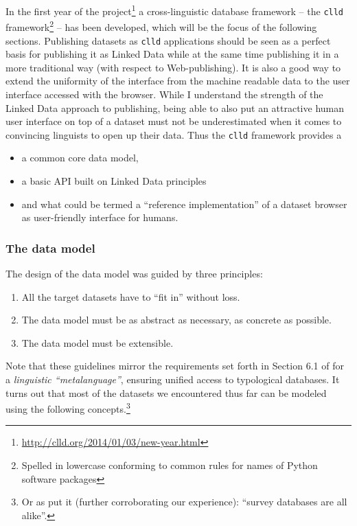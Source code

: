\documentclass[a4paper,10pt]{article}
\begin{document}
In the first year of the project\footnote{\url{http://clld.org/2014/01/03/new-year.html}} a cross-linguistic database framework -- the \texttt{clld} framework\footnote{Spelled in lowercase conforming to common rules for names of Python software packages} -- has been
developed, which will be the focus of the following sections.
Publishing datasets as \texttt{clld} applications should be seen as a perfect basis for publishing it as Linked Data while at the same time publishing it in a more traditional way (with respect to Web-publishing). It is also a good way to extend the uniformity of the interface from the machine readable data to the user interface accessed with the browser.
While I understand the strength of the Linked Data approach to publishing, being able to also put an attractive human user interface on top of a dataset must not be underestimated when it comes to convincing linguists to open up their data.
Thus the \texttt{clld} framework provides a
\begin{itemize}
\item a common core data model,
\item a basic API built on Linked Data principles
\item and what could be termed a ``reference implementation'' of a dataset browser as user-friendly
interface for humans.
\end{itemize}



\subsubsection{The data model}
\label{sec:datamodel}

The design of the data model was guided by three principles:
\begin{enumerate}
\item All the target datasets have to ``fit in'' without loss.
\item The data model must be as abstract as necessary, as concrete as possible.
\item The data model must be extensible.
\end{enumerate}

Note that these guidelines mirror the requirements set forth in Section 6.1 of 
for a \emph{linguistic ``metalanguage''}, ensuring unified access to typological databases.
It turns out that most of the datasets we encountered thus far can be modeled using the
following concepts.\footnote{Or as  put it (further corroborating our experience):
``survey databases are all alike''.}
\end{document}

